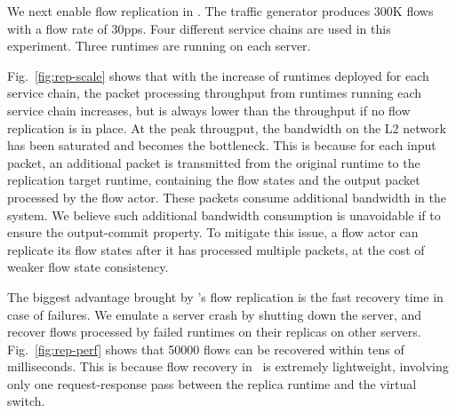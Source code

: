 
We next enable flow replication in \nfactor. The traffic generator produces 300K flows with a flow rate of 30pps.  %
Four different service chains are used in this experiment.
Three runtimes are running on each server.

Fig.~\ref{fig:rep-scale} shows that with the increase of runtimes deployed for each service chain, the packet processing throughput from runtimes running each service chain increases, but is always lower than the throughput if no flow replication is in place. %
At the peak througput, the bandwidth on the L2 network has been saturated and becomes the bottleneck. This is because for each input packet, an additional packet is transmitted from the original runtime to the replication target runtime, %
 containing the flow states and the output packet processed by the flow actor. These packets consume additional bandwidth in the system. %
 We believe such additional bandwidth consumption is unavoidable if to ensure the %
 output-commit property. To mitigate this issue, a flow actor can replicate its flow states after it has processed multiple packets, at the cost of weaker flow state consistency. %

The biggest advantage brought by \nfactor's flow replication is the fast recovery time in case of failures. %
We emulate a server crash by shutting down the server, and recover flows processed by failed runtimes on their replicas on other servers. Fig.~\ref{fig:rep-perf} shows that 50000 flows can be recovered within tens of milliseconds. This is because flow recovery in \nfactor~is extremely lightweight, involving only one request-response pass between the replica runtime and the virtual switch. %

